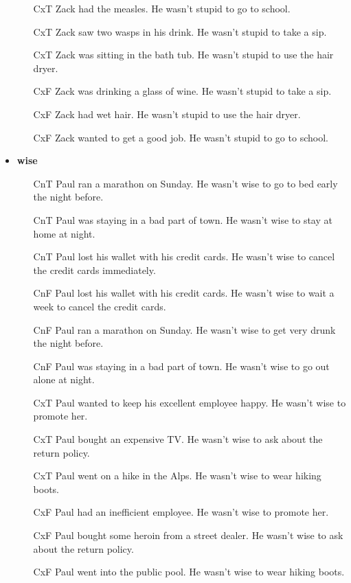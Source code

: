\documentclass[11pt,fleqn]{article}
\newcommand{\6}{\mbox{$[\hspace*{-.6mm}[$}}
\newcommand{\9}{\mbox{$]\hspace*{-.6mm}]$}}
\begin{document}
\begin{itemize}[itemsep=-1pt]
\begin{enumerate}[topsep=0pt,itemsep=-4pt]
\item[CxT] 	Zack had the measles.	He	wasn't stupid	to go to school.
\item[CxT] 	Zack saw two wasps in his drink.	He	wasn't stupid	to take a sip.
\item[CxT] 	Zack was sitting in the bath tub.	He	wasn't stupid	to use the hair dryer.
\item[CxF] 	Zack was drinking a glass of wine.	He	wasn't stupid	to take a sip.
\item[CxF] 	Zack had wet hair.	He	wasn't stupid	to use the hair dryer.
\item[CxF] 	Zack wanted to get a good job.	He	wasn't stupid	to go to school.

\end{enumerate}

\item {\bf wise}

\begin{enumerate}[topsep=0pt,itemsep=-4pt]


\item[CnT] 	Paul ran a marathon on Sunday.	He	wasn't wise	to go to bed early the night before.
\item[CnT] 	Paul was staying in a bad part of town.	He	wasn't wise	to stay at home at night.
\item[CnT] 	Paul lost his wallet with his credit cards.	He	wasn't wise	to cancel the credit cards immediately.
\item[CnF] 	Paul lost his wallet with his credit cards.	He	wasn't wise	to wait a week to cancel the credit cards.
\item[CnF] 	Paul ran a marathon on Sunday.	He	wasn't wise	to get very drunk the night before.
\item[CnF] 	Paul was staying in a bad part of town.	He	wasn't wise	to go out alone at night.
\item[CxT] 	Paul wanted to keep his excellent employee happy.	He	wasn't wise	to promote her.
\item[CxT] 	Paul bought an expensive TV.	He	wasn't wise	to ask about the return policy.
\item[CxT] 	Paul went on a hike in the Alps.	He	wasn't wise	to wear hiking boots.
\item[CxF] 	Paul had an inefficient employee.	He	wasn't wise	to promote her.
\item[CxF] 	Paul bought some heroin from a street dealer.	He	wasn't wise	to ask about the return policy.
\item[CxF] 	Paul went into the public pool.	He	wasn't wise	to wear hiking boots.

\end{enumerate}

\end{itemize}
\end{document}
